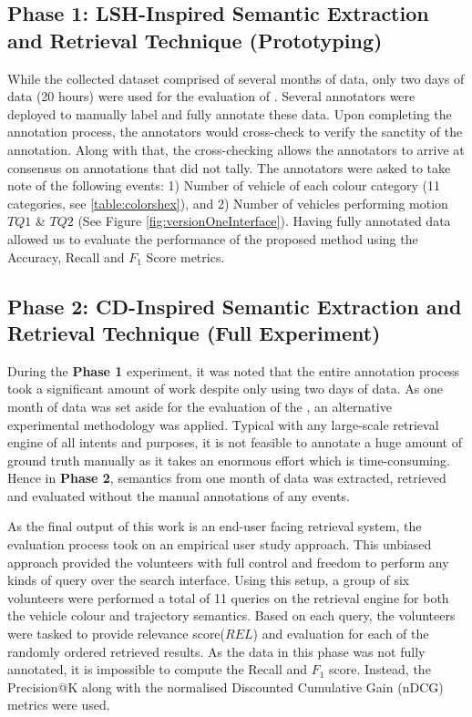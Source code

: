 \subsection{Phase 1: LSH-Inspired Semantic Extraction and Retrieval Technique (Prototyping)}
While the collected dataset comprised of several months of data, only two days of data (20 hours) were used for the evaluation of \versionOneRet. Several annotators were deployed to manually label and fully annotate these data. Upon completing the annotation process, the annotators would cross-check to verify the sanctity of the annotation.
Along with that, the cross-checking allows the annotators to arrive at consensus on annotations that did not tally. The annotators were asked to take note of the following events:
1) Number of vehicle of each colour category (11 categories, see \ref{table:colorshex}), and 2) Number of vehicles performing motion $TQ1$ \& $TQ2$ (See Figure \ref{fig:versionOneInterface}).
Having fully annotated data allowed us to evaluate the performance of the proposed method using the Accuracy, Recall and $F_1$ Score metrics.

\subsection{Phase 2: CD-Inspired Semantic Extraction and Retrieval Technique (Full Experiment)}

During the \textbf{Phase 1} experiment, it was noted that the entire annotation process took a significant amount of work despite only using two days of data. As one month of data was set aside for the evaluation of the \versionTwoRet, an alternative experimental methodology was applied.
Typical with any large-scale retrieval engine of all intents and purposes, it is not feasible to annotate a huge amount of ground truth manually as it takes an enormous effort which is time-consuming.
Hence in \textbf{Phase 2}, semantics from one month of data was extracted, retrieved and evaluated without the manual annotations of any events.

As the final output of this work is an end-user facing retrieval system, the evaluation process took on an empirical user study approach. This unbiased approach provided the volunteers with full control and freedom to perform any kinds of query over the search interface.
Using this setup, a group of six volunteers were performed a total of 11 queries on the retrieval engine for both the vehicle colour and trajectory semantics.
Based on each query, the volunteers were tasked to provide relevance score($REL$) and evaluation for each of the randomly ordered retrieved results.
As the data in this phase was not fully annotated, it is impossible to compute the Recall and $F_1$ score. Instead, the Precision@K along with the normalised Discounted Cumulative Gain (nDCG) metrics were used.

